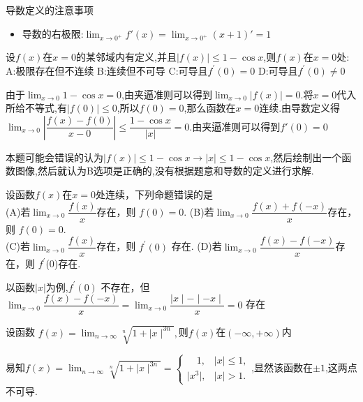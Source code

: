 \documentclass[8pt a4paper, oneside, UTF8]{ctexbook}  %
\begin{document}
\begin{sloppypar}
\begin{criterion}{导数定义的注意事项}{}
\begin{enumerate}
\begin{itemize}
                      \item 导数的右极限:$\lim_{x \to 0^+}f'(x)=\lim_{x\to 0^+}(x+1)' = 1$
                  \end{itemize}
        \end{enumerate}
    \end{criterion}
    \begin{problem}
    设$f(x)$在$x=0$的某邻域内有定义,并且$|f(x)|\leqslant1-\cos x$,则$f(x)$在$x=0$处:\\
    A:极限存在但不连续 \quad B:连续但不可导 \quad C:可导且$f^\prime(0)=0$ \quad D:可导且$f^\prime(0)\neq0$
    \end{problem}
    \begin{solution}
        由于$\lim_{x\to 0}1-\cos x=0$,由夹逼准则可以得到$\lim_{x\to 0}|f(x)|=0.$将$x=0$代入所给不等式,有$|f(0)|\leqslant 0$,所以$f(0)=0$,那么函数在$x=0$连续.由导数定义得$\lim_{x\to 0}\left|\dfrac{f(x)-f(0)}{x-0}\right|\leqslant \dfrac{1-\cos x}{|x|}=0$.由夹逼准则可以得到$f'(0)=0$
    \end{solution}
    \begin{note}
        本题可能会错误的认为$|f(x)|\leqslant 1-\cos x \to |x|\leqslant 1-\cos x$,然后绘制出一个函数图像,然后就认为B选项是正确的,没有根据题意和导数的定义进行求解.
    \end{note}
    \begin{problem}
    设函数$f(x)$在$x=0$处连续，下列命题错误的是\\
    (A)若$\lim_{x\to0}\dfrac{f(x)}x$存在，则 $f(0)=0.$\quad
    (B)若$\lim_{x\to0}\dfrac{f(x)+f(-x)}x$存在，则 $f(0)=0.$\\
    (C)若$\lim_{x\to0}\dfrac{f(x)}x$存在，则 $f^\prime(0)$ 存在.\quad
    (D)若$\lim_{x\to0}\dfrac{f(x)-f(-x)}x$存在，则 $f^\prime$(0)存在.
    \end{problem}
    \begin{solution}
        以函数$|x|$为例,$f^{\prime}(0)$ 不存在，但$\lim_{x\to0}\dfrac{f(x)-f(-x)}x=\lim_{x\to0}\dfrac{\mid x\mid-\mid-x\mid}x=0$ 存在
    \end{solution}
    \begin{problem}
    设函数 $f(x)=\operatorname*{lim}_{n\to\infty}\sqrt[n]{1+\mid x\mid^{3n}},$则$f(x)$在$\left(-\infty,+\infty\right)$内
    \end{problem}
    \begin{solution}
        易知$f(x)=\lim_{n\to\infty}\sqrt[n]{1+\mid x\mid^{3n}}=\begin{cases}\quad1,&\mid x\mid\leqslant1,\\\mid x^3\mid,&\mid x\mid>1.\end{cases}$,显然该函数在$\pm 1$,这两点不可导.

\end{solution}
\end{sloppypar}
\end{document}
